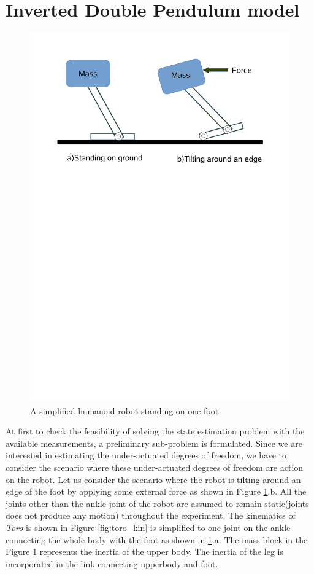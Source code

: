 \section{Inverted Double Pendulum model} 
\begin{figure}[H]
	\centering
	\includegraphics[trim = 0mm 180mm 0mm 10mm, scale=0.50]{Bilder/simp_uactcase.pdf}
	\caption{A simplified humanoid robot standing on one foot}
	\label{fig:idp_scene}
\end{figure}
At first to check the feasibility of solving the state estimation problem with the available measurements, a preliminary sub-problem is formulated. Since we are interested in estimating the under-actuated degrees of freedom, we have to consider the scenario where these under-actuated degrees of freedom are action on the robot. Let us consider the scenario where the robot is tilting around an edge of the foot by applying some external force as shown in Figure \ref{fig:idp_scene}.b. All the joints other than the ankle joint of the robot are assumed to remain static(joints does not produce any motion) throughout the experiment. The kinematics of \emph{Toro} is shown in Figure \ref{fig:toro_kin} is simplified to one joint on the ankle connecting the whole body with the foot as shown in \ref{fig:idp_scene}.a. The mass block in the Figure \ref{fig:idp_scene} represents the inertia of the upper body. The inertia of the leg is incorporated in the link connecting upperbody and foot. 

